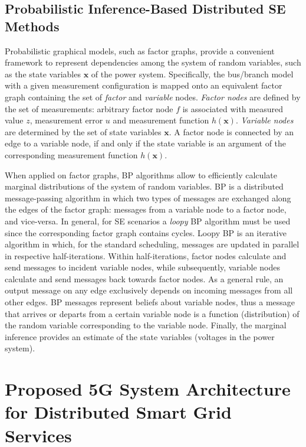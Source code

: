 \documentclass[journal]{IEEEtran}
\begin{document}
\subsection{Probabilistic Inference-Based Distributed SE Methods}  

Probabilistic graphical models, such as factor graphs, provide a convenient framework to represent dependencies among the system of random variables, such as the state variables $\mathbf x$ of the power system. Specifically, the bus/branch model with a given measurement configuration is mapped onto an equivalent factor graph containing the set of \emph{factor} and \emph{variable} nodes. \emph{Factor nodes} are defined by the set of measurements: arbitrary factor node $f$ is associated with measured value $z$, measurement error $u$ and measurement function $h(\mathbf x)$. \emph{Variable nodes} are determined by the set of state variables $\mathbf x$. A factor node is connected by an edge to a variable node, if and only if the state variable is an argument of the corresponding measurement function $h(\mathbf x)$.

When applied on factor graphs, BP algorithms allow to efficiently calculate marginal distributions of the system of random variables. BP is a distributed message-passing algorithm in which two types of messages are exchanged along the edges of the factor graph: messages from a variable node to a factor node, and vice-versa. In general, for SE scenarios a \emph{loopy} BP algorithm must be used since the corresponding factor graph contains cycles. Loopy BP is an iterative algorithm in which, for the standard scheduling, messages are updated in parallel in respective half-iterations.  Within half-iterations, factor nodes calculate and send messages to incident variable nodes, while subsequently, variable nodes calculate and send messages back towards factor nodes. As a general rule, an output message on any edge exclusively depends on incoming messages from all other edges. BP messages represent beliefs about variable nodes, thus a message that arrives or departs from a certain variable node is a function (distribution) of the random variable corresponding to the variable node. Finally, the marginal inference provides an estimate of the state variables (voltages in the power system).

\section{Proposed 5G System Architecture for Distributed Smart Grid Services}
\end{document}
